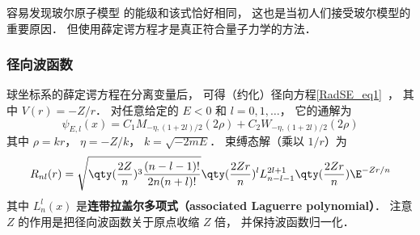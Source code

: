 容易发现玻尔原子模型 的能级和该式恰好相同， 这也是当初人们接受玻尔模型的重要原因． 但使用薛定谔方程才是真正符合量子力学的方法．

\subsubsection{径向波函数}
球坐标系的薛定谔方程在分离变量后， 可得（约化）径向方程\autoref{RadSE_eq1}~， 其中 $V(r) = -Z/r$． 对任意给定的 $E < 0$ 和 $l = 0,1,\dots$， 它的通解为
\begin{equation}
\psi_{E,l}(x) = C_1 M_{-\eta, (1+2l)/2}(2 \rho) + C_2 W_{-\eta, (1+2l)/2}(2 \rho)
\end{equation}
其中 $\rho = kr$， $\eta = -Z/k$， $k = \sqrt{-2mE}$．
束缚态解（乘以 $1/r$）为
\begin{equation}\label{HWF_eq2}
R_{nl}(r) = \sqrt{\qty(\frac{2 Z}{n})^3 \frac{(n - l - 1)!}{2n (n + l)!}} \qty(\frac{2Zr}{n})^l  L_{n-l-1}^{2l+1}\qty(\frac{2Zr}{n}) \E^{-Zr/n}
\end{equation}
其中 $L_n^l(x)$ 是\textbf{连带拉盖尔多项式（associated Laguerre polynomial）}． 注意 $Z$ 的作用是把径向波函数关于原点收缩 $Z$ 倍， 并保持波函数归一化．

